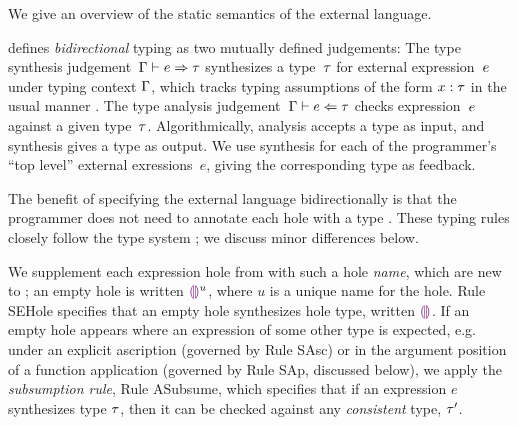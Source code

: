 
%
%
%

%




We give an overview of the static semantics of the \HazelnutLive
external language.

 defines \emph{bidirectional} typing
%
as two mutually defined judgements: The type synthesis
judgement~$\Gamma \vdash e \Rightarrow \tau$ synthesizes a type~$\tau$
for external expression~$e$ under typing context $\Gamma$, which tracks typing
assumptions of the form $x : \tau$ in the usual
manner \cite{pfpl,tapl}.
%
The type analysis judgement~$\Gamma \vdash e \Leftarrow \tau$ checks
expression~$e$ against a given type~$\tau$.
%
Algorithmically, analysis accepts a type as input, and synthesis gives
a type as output.
%
We use synthesis for each of the programmer's ``top level'' external
exressions~$e$, giving the corresponding type as feedback.


The benefit of specifying the \HazelnutLive external language
bidirectionally is that the programmer does not need to annotate each
hole with a type
%
\cite{Pierce:2000ve,bidi-tutorial,DBLP:conf/icfp/DunfieldK13,Chlipala:2005da}.
%
These typing rules closely follow the \Hazelnut type
system \cite{popl-paper}; we discuss minor differences below.

We supplement each expression hole from \Hazelnut with such a
hole \emph{name}, which are new to \HazelnutLive; an empty hole is
written $\textcolor{violet}{\llparenthesis}\textcolor{violet}{\rrparenthesis}^{u}$, where $u$ is a unique name for the hole.
%
Rule {SEHole} specifies that an empty hole synthesizes hole type, written $\textcolor{violet}{\llparenthesis}\textcolor{violet}{\rrparenthesis}$.
%
If an empty hole appears where an expression of some other type is
expected, e.g. under an explicit ascription (governed by Rule {SAsc})
or in the argument position of a function application (governed by
Rule {SAp}, discussed below), we apply the \emph{subsumption rule},
Rule {ASubsume}, which specifies that if an expression $e$ synthesizes
type $\tau$, then it can be checked against any \emph{consistent}
type, $\tau'$.

